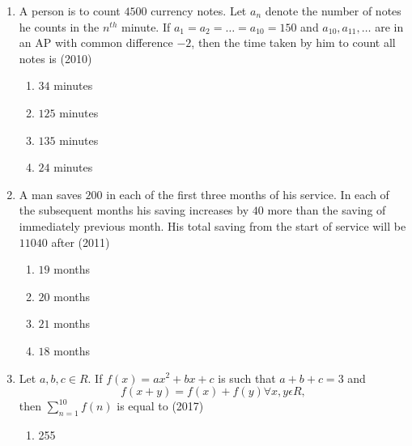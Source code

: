 \begin{enumerate}    [label=\thesubsection.\arabic*, ref=\thesubsection.\theenumi]
%    
    \hfill(2006)
%
    \begin{multicols}{4}
\begin{enumerate}    
    \item$n(a_1-a_n)$
    \item$(n-1)(a_1-a_n)$
    \item$na_1a_n$
    \item$(n-1)a_1a_n$ 
    \end{enumerate}
\end{multicols}
%    
%
%
    \item  A person is to count $4500$ currency notes. Let $a_n$ denote the number of notes he counts in the $n^{th}$ minute. If $a_1=a_2=\dots=a_{10}=150$ and $a_{10}, a_{11}, \dots$ are in an AP with common difference $-2$,  then the time taken by him to count all notes is   
%     
    \hfill(2010)
%    
    \begin{multicols}{4}
\begin{enumerate}    
    \item$34$ minutes
    \item$125$ minutes
    \item$135$ minutes
    \item$24$ minutes 
    \end{enumerate}
\end{multicols}
%
    \item A man saves \rupee$200$ in each of the first three months of his service. In each of the subsequent months his saving increases by \rupee$40$ more than the saving of immediately previous month. His total saving from the start of service will be \rupee$11040$ after    
%    
    \hfill(2011)
%    
    \begin{multicols}{4}
\begin{enumerate}    
    \item$19$ months
    \item$20$ months
    \item$21$ months
    \item$18$ months
%
    \end{enumerate}
\end{multicols}
%
%
  \item Let $a, b, c \in R$. If $f(x)=ax^2+bx+c$ is such that $a+b+c=3$ and $$f(x+y)=f(x)+f(y) \forall x, y \epsilon R,$$  then $\sum _{n=1}^{10}  f(n)$  is  equal  to \hfill (2017)
	 \begin{multicols}{4}
\begin{enumerate}    
  \item{255}

\end{enumerate}
\end{multicols}
\end{enumerate}
